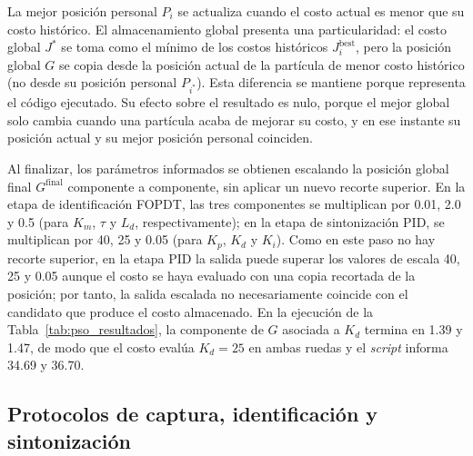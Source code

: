 \begin{appendices}
La mejor posición personal $P_i$ se actualiza cuando el costo actual es menor que su costo histórico. El almacenamiento global presenta una particularidad: el costo global $J^{*}$ se toma como el mínimo de los costos históricos $J_i^{\mathrm{best}}$, pero la posición global $G$ se copia desde la posición actual de la partícula de menor costo histórico (no desde su posición personal $P_{i^*}$). Esta diferencia se mantiene porque representa el código ejecutado. Su efecto sobre el resultado es nulo, porque el mejor global solo cambia cuando una partícula acaba de mejorar su costo, y en ese instante su posición actual y su mejor posición personal coinciden.

Al finalizar, los parámetros informados se obtienen escalando la posición global final $G^{\mathrm{final}}$ componente a componente, sin aplicar un nuevo recorte superior. En la etapa de identificación FOPDT, las tres componentes se multiplican por 0.01, 2.0 y 0.5 (para $K_m$, $\tau$ y $L_d$, respectivamente); en la etapa de sintonización PID, se multiplican por 40, 25 y 0.05 (para $K_p$, $K_d$ y $K_i$). Como en este paso no hay recorte superior, en la etapa PID la salida puede superar los valores de escala 40, 25 y 0.05 aunque el costo se haya evaluado con una copia recortada de la posición; por tanto, la salida escalada no necesariamente coincide con el candidato que produce el costo almacenado. En la ejecución de la Tabla~\ref{tab:pso_resultados}, la componente de $G$ asociada a $K_d$ termina en 1.39 y 1.47, de modo que el costo evalúa $K_d=25$ en ambas ruedas y el \textit{script} informa 34.69 y 36.70.

\subsection{Protocolos de captura, identificación y sintonización}
\label{anx:protocolos_sintonizacion}


\end{appendices}

